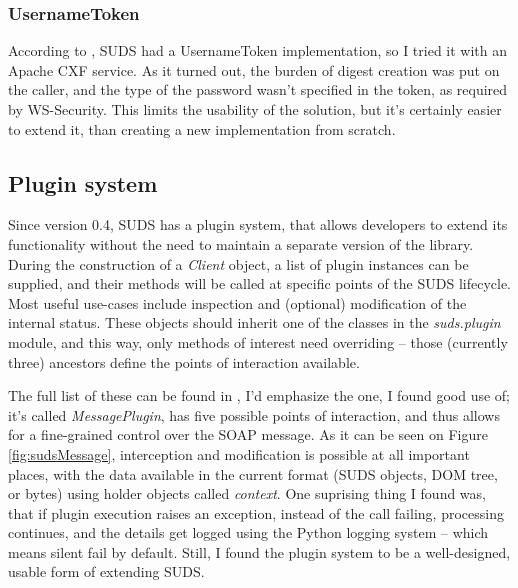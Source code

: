 \subsubsection{UsernameToken}
\label{sudsUsernameToken}

According to \cite{suds-doc}, SUDS had a UsernameToken implementation, so I tried it with an Apache CXF service. As it turned out, the burden of digest creation was put on the caller, and the type of the password wasn't specified in the token, as required by WS\hyp{}Security. This limits the usability of the solution, but it's certainly easier to extend it, than creating a new implementation from scratch.

\subsection{Plugin system}
\label{sudsPlugins}

Since version 0.4, SUDS has a plugin system, that allows developers to extend its functionality without the need to maintain a separate version of the library. During the construction of a \emph{Client} object, a list of plugin instances can be supplied, and their methods will be called at specific points of the SUDS lifecycle. Most useful use-cases include inspection and (optional) modification of the internal status. These objects should inherit one of the classes in the \emph{suds.plugin} module, and this way, only methods of interest need overriding -- those (currently three) ancestors define the points of interaction available.

The full list of these can be found in \cite{suds-doc}, I'd emphasize the one, I found good use of; it's called \emph{MessagePlugin}, has five possible points of interaction, and thus allows for a fine-grained control over the SOAP message. As it can be seen on Figure \ref{fig:sudsMessage}, interception and modification is possible at all important places, with the data available in the current format (SUDS objects, DOM tree, or bytes) using holder objects called \emph{context}. One suprising thing I found was, that if plugin execution raises an exception, instead of the call failing, processing continues, and the details get logged using the Python logging system -- which means silent fail by default. Still, I found the plugin system to be a well-designed, usable form of extending SUDS.
